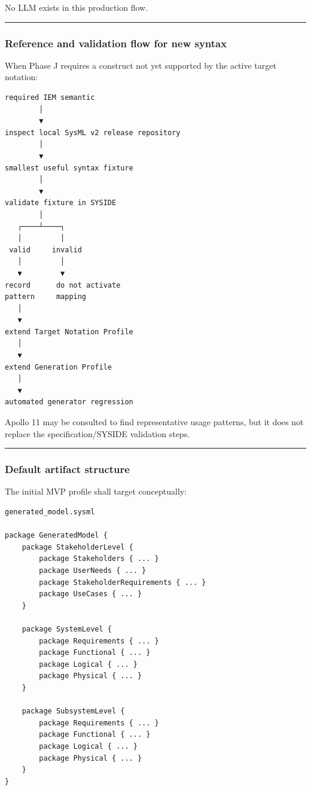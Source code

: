 No LLM exists in this production flow.

\begin{center}\rule{0.5\linewidth}{0.5pt}\end{center}

\hypertarget{reference-and-validation-flow-for-new-syntax}{%
\subsubsection{Reference and validation flow for new syntax}\label{reference-and-validation-flow-for-new-syntax}}

When Phase J requires a construct not yet supported by the active target notation:

\begin{verbatim}
required IEM semantic
        │
        ▼
inspect local SysML v2 release repository
        │
        ▼
smallest useful syntax fixture
        │
        ▼
validate fixture in SYSIDE
        │
   ┌────┴────┐
   │         │
 valid     invalid
   │         │
   ▼         ▼
record      do not activate
pattern     mapping
   │
   ▼
extend Target Notation Profile
   │
   ▼
extend Generation Profile
   │
   ▼
automated generator regression
\end{verbatim}

Apollo 11 may be consulted to find representative usage patterns, but it does not replace the specification/SYSIDE validation steps.

\begin{center}\rule{0.5\linewidth}{0.5pt}\end{center}

\hypertarget{default-artifact-structure}{%
\subsubsection{Default artifact structure}\label{default-artifact-structure}}

The initial MVP profile shall target conceptually:

\begin{verbatim}
generated_model.sysml

package GeneratedModel {
    package StakeholderLevel {
        package Stakeholders { ... }
        package UserNeeds { ... }
        package StakeholderRequirements { ... }
        package UseCases { ... }
    }

    package SystemLevel {
        package Requirements { ... }
        package Functional { ... }
        package Logical { ... }
        package Physical { ... }
    }

    package SubsystemLevel {
        package Requirements { ... }
        package Functional { ... }
        package Logical { ... }
        package Physical { ... }
    }
}
\end{verbatim}

